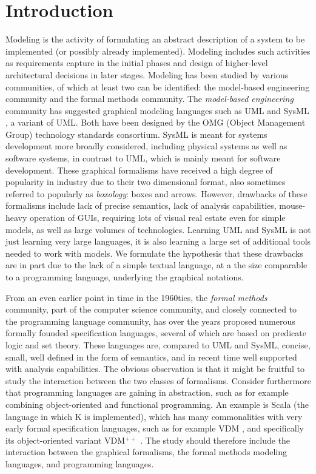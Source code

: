 \section{Introduction}
\label{sec:introduction}

Modeling is the activity of formulating an abstract description of a
system to be implemented (or possibly already implemented). Modeling
includes such activities as requirements capture in the initial phases
and design of higher-level architectural decisions in later
stages. Modeling has been studied by various communities, of which at
least two can be identified: the model-based engineering community and
the formal methods community. The {\em model-based engineering}
community has suggested graphical modeling languages such as UML
\cite{uml} and SysML \cite{sysml}, a variant of UML.  Both have been
designed by the OMG (Object Management Group) technology standards
consortium. SysML is meant for systems development more broadly
considered, including physical systems as well as software systems, in
contrast to UML, which is mainly meant for software development. These
graphical formalisms have received a high degree of popularity in
industry due to their two dimensional format, also sometimes referred
to popularly as {\em boxology}: boxes and arrows. However, drawbacks
of these formalisms include lack of precise semantics, lack of
analysis capabilities, mouse-heavy operation of GUIs, requiring lots
of visual real estate even for simple models, as well as large volumes
of technologies. Learning UML and SysML is not just learning very
large languages, it is also learning a large set of additional tools
needed to work with models. We formulate the hypothesis that these
drawbacks are in part due to the lack of a simple textual language, at
a the size comparable to a programming language, underlying the
graphical notations.

From an even earlier point in time in the 1960ties, the {\em formal
  methods} community, part of the computer science community, and
closely connected to the programming language community, has over the
years proposed numerous formally founded specification languages,
several of which are based on predicate logic and set theory. These
languages are, compared to UML and SysML, concise, small, well defined
in the form of semantics, and in recent time well supported with
analysis capabilities. The obvious observation is that it might be
fruitful to study the interaction between the two classes of
formalisms. Consider furthermore that programming languages are
gaining in abstraction, such as for example combining object-oriented
and functional programming. An example is Scala (the language in which
K is implemented), which has many commonalities with very early formal
specification languages, such as for example VDM \cite{vdm78}, and
specifically its object-oriented variant VDM$^{++}$
\cite{vdmplusplus05}.  The study should therefore include the
interaction between the graphical formalisms, the formal methods
modeling languages, and programming languages.

